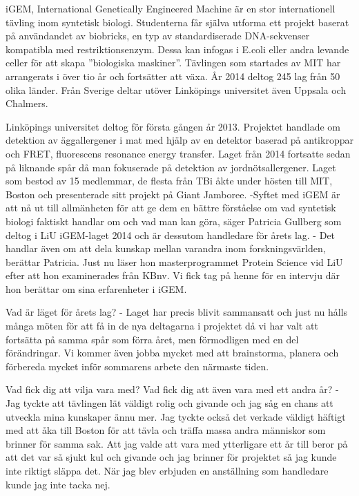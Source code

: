 


iGEM, International Genetically Engineered Machine är en stor internationell tävling inom syntetisk biologi. Studenterna får själva utforma ett projekt baserat på användandet av biobricks, en typ av standardiserade DNA-sekvenser kompatibla med restriktionsenzym. Dessa kan infogas i E.coli eller andra levande celler för att skapa ”biologiska maskiner”. Tävlingen som startades av MIT har arrangerats i över tio år och fortsätter att växa. År 2014 deltog 245 lag från 50 olika länder. Från Sverige deltar utöver Linköpings universitet även Uppsala och Chalmers.






Linköpings universitet deltog för första gången år 2013. Projektet handlade om detektion av äggallergener i mat med hjälp av en detektor baserad på antikroppar och FRET, fluorescens resonance energy transfer. Laget från 2014 fortsatte sedan på liknande spår då man fokuserade på detektion av jordnötsallergener. Laget som bestod av 15 medlemmar, de flesta från TBi åkte under hösten till MIT, Boston och presenterade sitt projekt på Giant Jamboree. 
-Syftet med iGEM är att nå ut till allmänheten för att ge dem en bättre förståelse om vad syntetisk biologi faktiskt handlar om och vad man kan göra, säger Patricia Gullberg som deltog i LiU iGEM-laget 2014 och är dessutom handledare för årets lag.
- Det handlar även om att dela kunskap mellan varandra inom forskningsvärlden, berättar Patricia. Just nu läser hon masterprogrammet Protein Science vid LiU efter att hon examinerades från KBnv. Vi fick tag på henne för en intervju där hon berättar om sina erfarenheter i iGEM. 


Vad är läget för årets lag?
- Laget har precis blivit sammansatt och just nu hålls många möten för att få in de nya deltagarna i projektet då vi har valt att fortsätta på samma spår som förra året, men förmodligen med en del förändringar. Vi kommer även jobba mycket med att brainstorma, planera och förbereda mycket inför sommarens arbete den närmaste tiden.

Vad fick dig att vilja vara med? Vad fick dig att även vara med ett andra år?
- Jag tyckte att tävlingen lät väldigt rolig och givande och jag såg en chans att utveckla mina kunskaper ännu mer. Jag tyckte också det verkade väldigt häftigt med att åka till Boston för att tävla och träffa massa andra människor som brinner för samma sak. Att jag valde att vara med ytterligare ett år till beror på att det var så sjukt kul och givande och jag brinner för projektet så jag kunde inte riktigt släppa det. När jag blev erbjuden en anställning som handledare kunde jag inte tacka nej.

